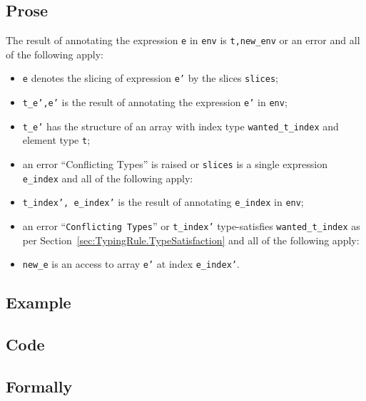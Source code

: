 \documentclass{book}
\begin{document}
  \subsection{Prose}
  The result of annotating the expression \texttt{e} in \texttt{env} is
\texttt{t,new\_env} or an error and all of the following apply:
  \begin{itemize}
  \item \texttt{e} denotes the slicing of expression \texttt{e'} by the slices \texttt{slices};
  \item \texttt{t\_e',e'} is the result of annotating the expression \texttt{e'} in \texttt{env};
  \item \texttt{t\_e'} has the structure of an array with index type \texttt{wanted\_t\_index} and element type \texttt{t};
  \item an error ``Conflicting Types'' is raised or \texttt{slices} is a single expression \texttt{e\_index} and all of the following apply:
  \item \texttt{t\_index', e\_index'} is the result of annotating \texttt{e\_index} in \texttt{env};
  \item an error ``\texttt{Conflicting Types}'' or \texttt{t\_index'} type-satisfies \texttt{wanted\_t\_index} as per Section~\ref{sec:TypingRule.TypeSatisfaction} and all of the following apply:
  \item \texttt{new\_e} is an access to array \texttt{e'} at index \texttt{e\_index'}.
  \end{itemize}

  \subsection{Example}

  \subsection{Code}

\begin{emptyformal}
    \subsection{Formally}
\end{emptyformal}

\end{document}
